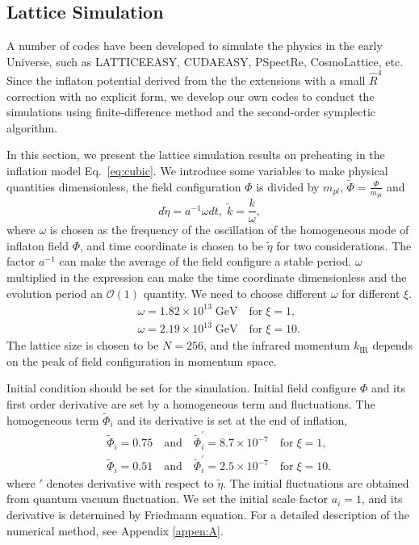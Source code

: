 \documentclass[12pt, a4paper]{article}
\begin{document}
\subsection{Lattice Simulation}\label{section:lattice}

A number of codes have been developed to simulate the physics in the early Universe, such as LATTICEEASY\cite{Felder:2000hq}, CUDAEASY\cite{Sainio:2009hm}, PSpectRe\cite{Easther:2010qz}, CosmoLattice\cite{Figueroa:2020rrl,Figueroa:2021yhd}, etc. Since the inflaton potential derived from the the extensions with a small $\hat{R}^4$ correction with no explicit form, we develop our own codes to conduct the simulations using finite-difference method and the second-order symplectic algorithm.

In this section, we present the lattice simulation results on preheating in the inflation model Eq.~\ref{eq:cubic}. We introduce some variables to make physical quantities dimensionless, the field configuration $\Phi$ is divided by $m_{pl}$, $\tilde{\Phi}=\frac{\Phi}{m_{pl}}$ and
\begin{equation}
  d\tilde{\eta}= a^{-1} \omega dt,\;
  \tilde{k}=\frac{k}{\omega},
\end{equation}
where $\omega$ is chosen as the frequency of the oscillation of the homogeneous mode of inflaton field $\Phi$, and time coordinate is chosen to be $\tilde{\eta}$ for two considerations. The factor $a^{-1}$ can make the average of the field configure a stable period. $\omega$ multiplied in the expression can make the time coordinate dimensionless and the evolution period an $\mathcal{O}\left(1\right)$ quantity.
We need to choose different $\omega$ for different $\xi$.
\begin{eqnarray}
&&\omega=1.82\times10^{13}\; \text{GeV} \quad \text{for} \; \xi=1,   \nonumber  \\
&&\omega=2.19\times10^{13}\; \text{GeV} \quad \text{for} \; \xi=10.
\end{eqnarray}
The lattice size is chosen to be $N=256$, and the infrared momentum $k_{\text{IR}}$ depends on the peak of field configuration in momentum space.

Initial condition should be set for the simulation. Initial field configure $\Phi$ and its first order derivative are set by a homogeneous term and fluctuations. The homogeneous term $\tilde{\Phi}_{i}$ and its derivative is set at the end of inflation,
\begin{eqnarray}
&&\tilde{\Phi}_{i}=0.75 \quad \text{and} \quad \tilde{\Phi}_{i}^{\prime}=8.7\times10^{-7} \quad \text{for}\; \xi=1,   \nonumber\\
&&\tilde{\Phi}_{i}=0.51 \quad \text{and} \quad \tilde{\Phi}_{i}^{\prime}=2.5\times10^{-7} \quad \text{for}\; \xi=10.
\end{eqnarray}
where $\prime$ denotes derivative with respect to $\tilde{\eta}$.
The initial fluctuations are obtained from quantum vacuum fluctuation. We set the initial scale factor $a_i=1$, and
its derivative is determined by Friedmann equation. For a detailed description of the numerical method, see Appendix \ref{appen:A}.
\end{document}
